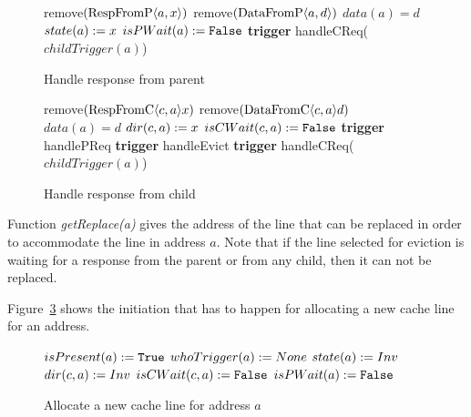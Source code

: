 \begin{figure}
\begin{algorithmic}
  \State remove$(\text{RespFromP$\langle a,x\rangle$})$
     \State remove$(\text{DataFromP$\langle a,d\rangle$})$
     \State $data(a) = d$
  \EndIf
  \State $state(a) := x$
  \State $isPWait(a) := \texttt{False}$ 
  \State \textcolor{trig-color}{\textbf{trigger} handleCReq($childTrigger(a)$)}
\EndRule
\end{algorithmic}
\caption{Handle response from parent}
\label{alg:handlePResp}
\end{figure}

\begin{figure}
\begin{algorithmic}
  \State remove$(\text{RespFromC$\langle c,a\rangle$}{x})$
     \State remove$(\text{DataFromC$\langle c,a\rangle$}{d})$
     \State $data(a) = d$
  \EndIf
  \State $dir(c,a) := x$
    \State $isCWait(c, a) := \texttt{False}$
  \EndIf
  {\color{trig-color}
     \State \textbf{trigger} handlePReq
     \State \textbf{trigger} handleEvict
     \State \textbf{trigger} handleCReq($childTrigger(a)$)
  \EndIf}
\EndRule
\end{algorithmic}
\caption{Handle response from child}
\label{alg:handleCResp}
\end{figure}

Function \emph{getReplace(a)} gives the address of the line that can be replaced
in order to accommodate the line in address $a$. Note that if the line selected
for eviction is waiting for a response from the parent or from any child, then
it can not be replaced.

Figure~\ref{alg:allocLine} shows the initiation that has to happen for
allocating a new cache line for an address.

\begin{figure}
\begin{algorithmic}
  \State $isPresent(a) := \texttt{True}$
  \State \textcolor{trig-color}{$whoTrigger(a) := None$}
  \State $state(a) := \text{$Inv$}$
     \State $dir(c, a) := \text{$Inv$}$
     \State $isCWait(c, a) := \texttt{False}$
  \EndFor
  \State $isPWait(a) := \texttt{False}$
\EndProcedure
\end{algorithmic}
\caption{Allocate a new cache line for address $a$}
\label{alg:allocLine}
\end{figure}

